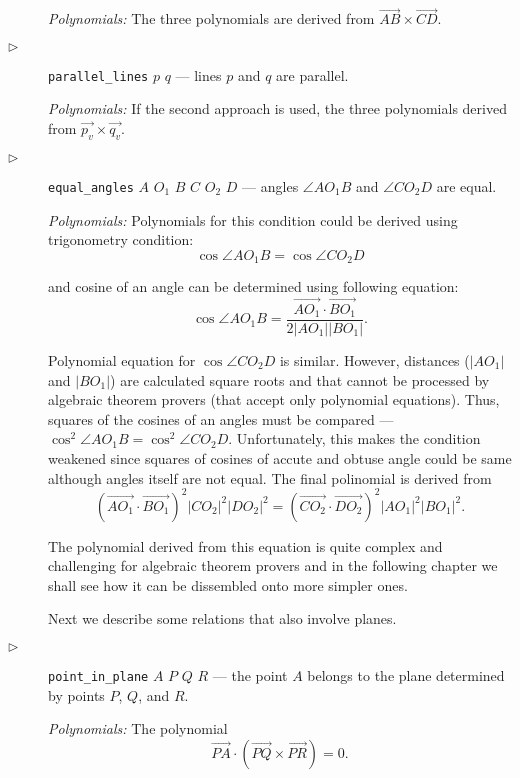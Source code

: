\documentclass[final,1p,times,authoryear]{elsarticle}
\begin{document}
\begin{description}
  {\em Polynomials:} The three polynomials are derived from
  $\overrightarrow{AB} \times \overrightarrow{CD}$.

\item[$\triangleright$] {\tt parallel\_lines} $p$ $q$ --- lines $p$
  and $q$ are parallel.

  {\em Polynomials:} If the second approach is used, the three
  polynomials derived from
  $\overrightarrow{p_v} \times \overrightarrow{q_v}$.


\item[$\triangleright$] {\tt equal\_angles} $A$ $O_1$ $B$ $C$ $O_2$ $D$ --- angles $\angle AO_1B$ and $\angle
CO_2D$ are equal.

{\em Polynomials:} Polynomials for this condition could be derived
using trigonometry condition:
$$\cos{\angle AO_1B} = \cos{\angle CO_2D}$$

and cosine of an angle can be determined using following equation:
$$\cos{\angle AO_1B} = \frac{\overrightarrow{AO_1}\cdot
  \overrightarrow{BO_1}}{2|AO_1||BO_1|}.$$

Polynomial equation for $\cos{\angle CO_2D}$ is similar. However,
distances ($|AO_1|$ and $|BO_1|$) are calculated square roots and that
cannot be processed by algebraic theorem provers (that accept only
polynomial equations). Thus, squares of the cosines of an angles must
be compared --- $\cos^2{\angle AO_1B} = \cos^2{\angle CO_2D}$.
Unfortunately, this makes the condition weakened since squares of
cosines of accute and obtuse angle could be same although angles
itself are not equal. The final polinomial is derived from
$$(\overrightarrow{AO_1}\cdot  \overrightarrow{BO_1})^2|CO_2|^2|DO_2|^2 = (\overrightarrow{CO_2}\cdot  \overrightarrow{DO_2})^2|AO_1|^2|BO_1|^2.$$

The polynomial derived from this equation is quite complex and
challenging for algebraic theorem provers and in the following chapter
we shall see how it can be dissembled onto more simpler ones.

\bigskip

Next we describe some relations that also involve planes.

\item[$\triangleright$] {\tt point\_in\_plane} $A$ $P$ $Q$ $R$
  --- the point $A$ belongs to the plane determined by points $P$,
  $Q$, and $R$.

  {\em Polynomials:} The polynomial
$$\overrightarrow{PA}\cdot (\overrightarrow{PQ} \times \overrightarrow{PR}) = 0.$$


\end{description}
\end{document}
